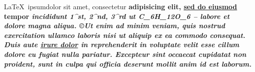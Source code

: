 \LaTeX~ipsum\texttrademark dolor
sit amet, con\-secte\-tur \bf{adipisicing} elit, \href{http://d3js.org}{sed do eiusmod}
tempor \it{incididunt} 1^{st}, 2^{nd}, 3^{rd} ut C_{6}H_{12}O_6 --  \texteuro labore et dolore magna {\color{red}aliqua}. {\copyright}Ut enim ad minim veniam,
quis nostrud \bf{exercitation} ullamco \it{laboris \bf{nisi}} ut aliquip ex ea commodo
consequat. \\
\newline
Duis aute \href{http://d3js.org}{irure dolor} in reprehenderit in voluptate velit esse
cillum dolore eu fugiat nulla pariatur. Excepteur sint occaecat cupidatat non
proident, sunt in culpa qui officia deserunt mollit anim id est laborum.
